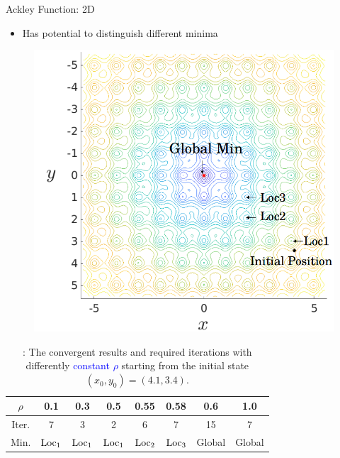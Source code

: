 \documentclass{beamer}
\begin{document}
\begin{frame}{Ackley Function: 2D}
\begin{itemize}
	\item Has potential to distinguish different minima
\end{itemize}
\begin{figure}[!htbp]
	\centering
	  \includegraphics[scale=0.18]{./figures/ackley_LG.png}
\end{figure}
\vspace{-0.6cm}
\footnotesize{
\begin{table}[!htbp]
\caption{\label{tab:ackley:r}: The convergent results and required
iterations with differently \textcolor{blue}{constant $\rho$}
starting from the initial state $(x_0, y_0)=(4.1, 3.4)$.}
\begin{center}
\begin{tabular}{|c|c|c|c|c|c|c|c|}
 \hline
 $\rho$ & 0.1 & 0.3 & 0.5 & 0.55 & 0.58 &  0.6 & 1.0
 \\\hline
 Iter. & 7   & 3   &  2  & 6 & 7 & 15 & 7
 \\\hline
 Min. & $\rm{Loc_1}$ & $\rm{Loc_1}$ & $\rm{Loc_1}$ & $\rm{Loc_2}$
	& $\rm{Loc_3}$ & Global & Global
 \\\hline
\end{tabular}
\end{center}
\end{table}
}
\end{frame}
\end{document}
